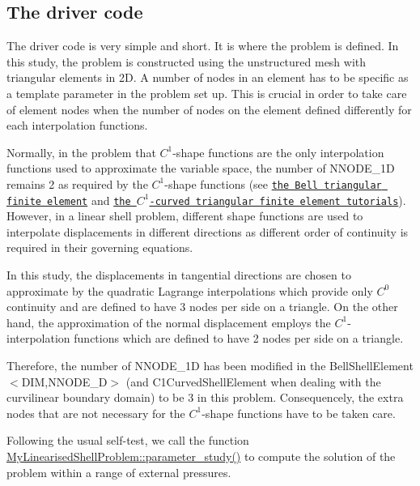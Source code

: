\hypertarget{index_main}{}\subsection{The driver code}\label{index_main}
The driver code is very simple and short. It is where the problem is defined. In this study, the problem is constructed using the unstructured mesh with triangular elements in 2D. A number of nodes in an element has to be specific as a template parameter in the problem set up. This is crucial in order to take care of element nodes when the number of nodes on the element defined differently for each interpolation functions.

Normally, in the problem that $ C^1 $-\/shape functions are the only interpolation functions used to approximate the variable space, the number of {\ttfamily N\+N\+O\+D\+E\+\_\+1D} remains 2 as required by the $ C^1 $-\/shape functions (see \href{../../../c1_element/bell_element/html/index.html}{\tt the Bell triangular finite element} and \href{../../../c1_element/curved_element/html/index.html}{\tt the $ C^1 $-\/curved triangular finite element tutorials}). However, in a linear shell problem, different shape functions are used to interpolate displacements in different directions as different order of continuity is required in their governing equations.

In this study, the displacements in tangential directions are chosen to approximate by the quadratic Lagrange interpolations which provide only $ C^0 $ continuity and are defined to have 3 nodes per side on a triangle. On the other hand, the approximation of the normal displacement employs the $ C^1 $-\/interpolation functions which are defined to have 2 nodes per side on a triangle.

Therefore, the number of {\ttfamily N\+N\+O\+D\+E\+\_\+1D} has been modified in the {\ttfamily Bell\+Shell\+Element$<$\+D\+I\+M,\+N\+N\+O\+D\+E\+\_\+D$>$} (and {\ttfamily C1\+Curved\+Shell\+Element} when dealing with the curvilinear boundary domain) to be 3 in this problem. Consequencely, the extra nodes that are not necessary for the $ C^1 $-\/shape functions have to be taken care.

Following the usual self-\/test, we call the function {\ttfamily \hyperlink{classMyLinearisedShellProblem_ab9255e3cbaae69ad5d61757d891b633e}{My\+Linearised\+Shell\+Problem\+::parameter\+\_\+study()}} to compute the solution of the problem within a range of external pressures.


